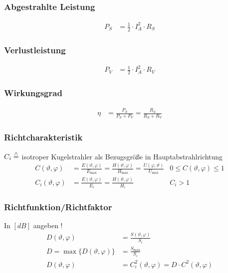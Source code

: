 

\subsubsection{Abgestrahlte Leistung}
\begin{align*}
    P_S & = \frac{1}{2}\cdot I_A^2 \cdot R_S
\end{align*}

\subsubsection{Verlustleistung}
\begin{align*}
    P_V & = \frac{1}{2}\cdot I_A^2\cdot R_V
\end{align*}

\subsubsection{Wirkungsgrad}
\begin{align*}
    \eta & = \frac{P_S}{P_S + P_V} = \frac{R_S}{R_S + R_V}
\end{align*}

\subsubsection{Richtcharakteristik}
$C_{i} \stackrel{\wedge}{=}$ isotroper Kugelstrahler als Bezugsgröße in Hauptabstrahlrichtung
\begin{align*}
    C(\vartheta, \varphi)     & = \frac{E(\vartheta, \varphi)}{E_{\max}}=\frac{H(\vartheta, \varphi)}{H_{\max}} = \frac{U(\varphi,\vartheta)}{U_{\max}} & 0 \leq C(\vartheta, \varphi) \leq 1 \\
    C_{i}(\vartheta, \varphi) & = \frac{E(\vartheta, \varphi)}{E_{i}}=\frac{H(\vartheta, \varphi)}{H_{i}}                                               & C_{i}>1
\end{align*}

\subsubsection{Richtfunktion/Richtfaktor}
In $[\si{dB}]$ angeben !
\begin{align*}
    D(\vartheta, \varphi)             & = \frac{S(\vartheta, \varphi)}{S_{i}}                               \\
    D =\max \{D(\vartheta, \varphi)\} & = \frac{S_{\max}}{S_{i}}                                            \\
    D(\vartheta, \varphi)             & = C_{i}^{2}(\vartheta, \varphi) = D \cdot C^{2}(\vartheta, \varphi)
\end{align*}

